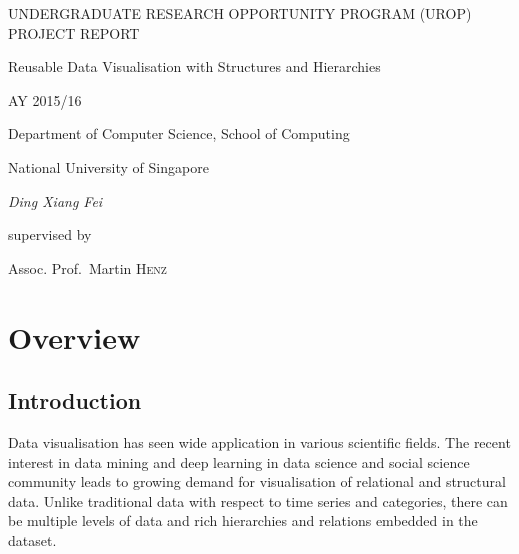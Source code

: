 \documentclass[11pt, a4paper]{report}
\providecommand{\keywords}[1]{\textbf{\textit{Keywords ---}} #1}
\begin{document}
\begin{titlepage}
\centering
{\LARGE UNDERGRADUATE RESEARCH OPPORTUNITY PROGRAM (UROP) PROJECT REPORT\par}
\vspace{2cm}
{\LARGE Reusable Data Visualisation with Structures and Hierarchies\par}
\vspace{2cm}
{\Large AY 2015/16\par}
\vspace{2cm}
{\Large Department of Computer Science, School of Computing\par}
{\Large National University of Singapore\par}
\vspace {5cm}
{\Large\itshape Ding Xiang Fei\par}
\vspace {0.5cm}
{\small supervised by\par}
\vspace {0.5cm}
{\Large Assoc. Prof.~Martin \textsc{Henz}}
\end{titlepage}
\tableofcontents
\begin{abstract}
Recent innovations in visualisation techniques and concepts lead to a greater demand for novel chart types. Research in fields such as social sciences and data sciences produces more data in order to reveal relational and structural data, and visualisation of these data will help social scientists to gain better understanding. Meanwhile, many tools have been developed for visualisation with more flexible data formats or greater variety in types of charts. These includes Microsoft Excel, Chart.js and $\mathbb D^3$. These systems do not yet support modification and authoring of chart types systematically and clear path of data processing which is crucial in processing relational and structural data into actual visualisation. In this work, we will focus on visualisation of relational and structural data and study the capability of relevant tools, including those we have just mentioned. We then explore a better visualisation strategy and methodology that leverage advantages from various tools and produce flexible, responsive and reusable chart designs and visualisation applications.\par
\keywords{visualisation, structural, hierarchy, observation}
\end{abstract}
\chapter{Overview}
\section{Introduction}
Data visualisation has seen wide application in various scientific fields. The recent interest in data mining and deep learning in data science and social science community leads to growing demand for visualisation of relational and structural data. Unlike traditional data with respect to time series and categories, there can be multiple levels of data and rich hierarchies and relations embedded in the dataset.
\end{document}
